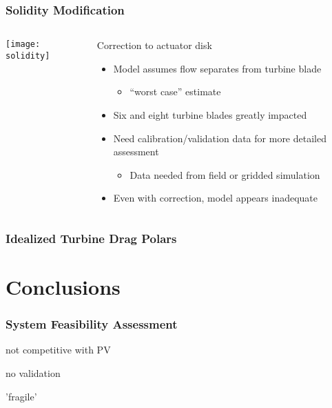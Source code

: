 \documentclass[mathserif]{beamer}
\begin{document}
%
%
\begin{frame}
 \frametitle{Solidity Modification}


 \begin{columns}[]
  \begin{column}{0.55\linewidth}


   \begin{center}
    \texttt{[image: solidity]}
   \end{center}

  \end{column}
  \begin{column}{0.45\linewidth}
   
   \begin{block}{Correction to actuator disk}
    \begin{itemize}
     \item Model assumes flow separates from turbine blade
	   \begin{itemize}
	    \item ``worst case'' estimate
	   \end{itemize}
     \item Six and eight turbine blades greatly impacted
     \item Need calibration/validation data for more detailed assessment  
	   \begin{itemize}
	    \item Data needed from field or gridded simulation
	   \end{itemize}
     \item Even with correction, model appears inadequate
    \end{itemize}

   \end{block}
  \end{column}
 \end{columns}


\end{frame}



%
%
\begin{frame}
 \frametitle{Idealized Turbine Drag Polars}



\end{frame}


%
%
\section{Conclusions}
\begin{frame}
 \frametitle{System Feasibility Assessment}

 not competitive with PV

 no validation

 'fragile'

\end{frame}
\end{document}
